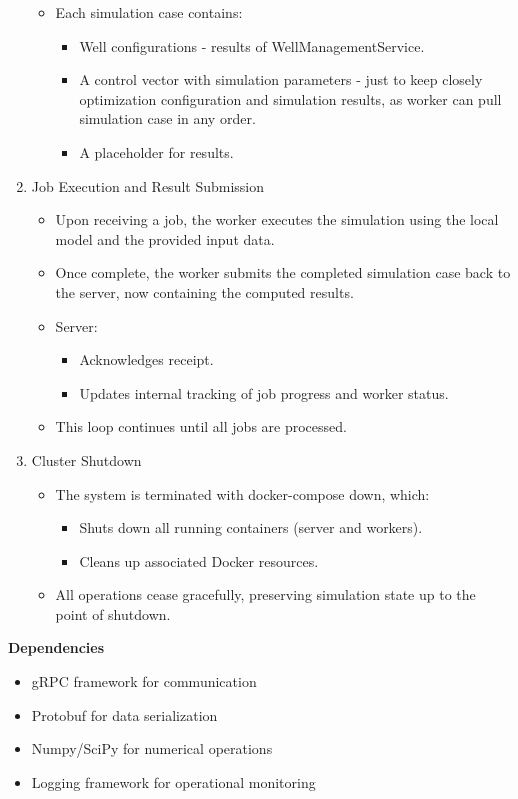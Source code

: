 \begin{enumerate}
\begin{itemize}
\begin{itemize}
		\end{itemize}
		\item Each simulation case contains:
		\begin{itemize}
			\item Well configurations - results of WellManagementService.
			\item A control vector with simulation parameters - just to keep closely optimization configuration and simulation results, as worker can pull simulation case in any order. 
			\item A placeholder for results.
		\end{itemize}
	\end{itemize}
	\item Job Execution and Result Submission
	\begin{itemize}
		\item Upon receiving a job, the worker executes the simulation using the local model and the provided input data.
		\item Once complete, the worker submits the completed simulation case back to the server, now containing the computed results.
		\item Server:
		\begin{itemize}
			\item Acknowledges receipt.
			\item Updates internal tracking of job progress and worker status.
		\end{itemize}
		\item This loop continues until all jobs are processed.
	\end{itemize}
	\item Cluster Shutdown
	\begin{itemize}
		\item The system is terminated with docker-compose down, which:
		\begin{itemize}
			\item Shuts down all running containers (server and workers).
			\item Cleans up associated Docker resources.
		\end{itemize}
		\item All operations cease gracefully, preserving simulation state up to the point of shutdown.
	\end{itemize}
\end{enumerate}

\bigskip
\textbf{Dependencies}

\begin{itemize}
	\item gRPC framework for communication
	\item Protobuf for data serialization
	\item Numpy/SciPy for numerical operations
	\item Logging framework for operational monitoring
\end{itemize}



